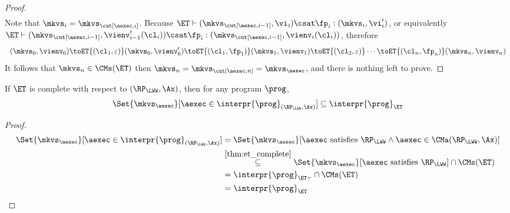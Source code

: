 \begin{proof}
\[\begin{array}{l}
\end{array}
\]
Note that $\mkvs_{i} = \mkvs_{\cut[\aexec, i]}$. 
Because $\ET \vdash ( \mkvs_{\cut[\aexec,i-1]}, \vi_i ) \csat \fp_{i} : (\mkvs_{i}, \vi'_{i})$, 
or equivalently $\ET \vdash ( \mkvs_{\cut[\aexec, i-1]}, \vienv'_{i-1}(\cl_{i}) ) \csat \fp_{i} : ( \mkvs_{\cut[\aexec, i-1]}, \vienv_{i}(\cl_{i}) )$, therefore 
\[
\begin{array}{l}
(\mkvs_{0}, \vienv_{0}) \toET{(\cl_{1}, \varepsilon)} (\mkvs_{0}, \vienv'_{0}) 
\toET{(\cl_{1}, \fp_{1})} (\mkvs_{1}, \vienv_{1})
\toET{(\cl_{2}, \varepsilon)}
\cdots \toET{(\cl_{n}, \fp_{n})} (\mkvs_{n}, \vienv_{n})
\end{array}
\]
It follows that $\mkvs_{n} \in \CMs(\ET)$ then $\mkvs_{n} = \mkvs_{\cut[\aexec, n]} = \mkvs_{\aexec}$, and there is nothing left to prove.
\end{proof}

\begin{corollary}
\label{cor:et-completeness}
If $\ET$ is complete with respect to $(\RP_{\LWW}, \Ax)$, then 
for any program $\prog$, 
\[\Set{ \mkvs_{\aexec} }[ \aexec \in \interpr{\prog}_{(\RP_{\LWW}, \Ax)} ] \subseteq \interpr{\prog}_{\ET}\]
\end{corollary}
\begin{proof}
\begin{align*}
\Set{ \mkvs_{\aexec} }[ \aexec \in \interpr{\prog}_{(\RP_{\LWW}, \Ax)} ]
& \stackrel{%
}{=} 
\Set{\mkvs_{\aexec} }[ \aexec \text{ satisfies } \RP_{\LWW} \land \aexec \in \CMa(\RP_{\LWW}, \Ax) ] \\
& \stackrel{\cref{thm:et_complete}}{\subseteq} 
\Set{\mkvs_{\aexec} }[ \aexec \text{ satisfies } \RP_{\LWW}] \cap \CMs(\ET) \\
& \stackrel{%
}{=} 
\interpr{\prog}_{\ET_\top} \cap \CMs(\ET) \\
& \stackrel{%
}{=} 
\interpr{\prog}_{\ET} 
\end{align*}
\end{proof}
